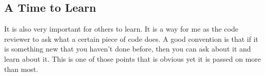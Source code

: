 \subsection{ A Time to Learn }
It is also very important for others to learn. It is a way for me as the code
reviewer to ask what a certain piece of code does. A good convention is that if
it is something new that you haven't done before, then you can ask about it
and learn about it. This is one of those points that is obvious yet it is passed
on more than most.
